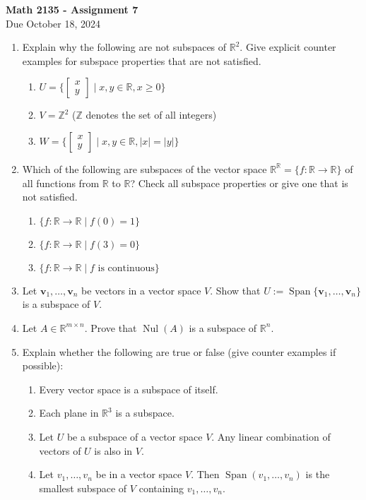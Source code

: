 \documentclass[12pt,oneside]{amsart}
\newcommand{\bv}{\mathbf{v}}
\newcommand{\Z}{\mathbb{Z}}
\newcommand{\R}{\mathbb{R}}
\DeclareMathOperator{\Span}{Span}
\DeclareMathOperator{\Nul}{Nul}
\newcommand{\vt}[2]{\left[\begin{matrix} #1 \\ #2 \end{matrix}\right]}
\begin{document}
\begin{center}
{\Large\textbf{Math 2135 - Assignment 7}}\\
\bigskip
Due October 18, 2024 \\
\end{center}
\bigskip
\thispagestyle{empty}


\begin{enumerate}
 \item
 Explain why the following are not subspaces of $\R^2$.
 Give explicit counter examples for subspace properties that are not satisfied. 
 \begin{enumerate}
 \item $U = \{ \vt{x}{y} \mid x,y\in\R, x\geq 0 \}$
 \item $V = \Z^2$ \quad ($\Z$ denotes the set of all integers)
 \item $W = \{ \vt{x}{y} \mid x,y\in\R, |x|=|y| \}$
 \end{enumerate}
 
\item
 Which of the following are subspaces of the vector space $\R^\R = \{ f \colon \R \to \R \}$ of all functions from
 $\R$ to $\R$? Check all subspace properties or give one that is not satisfied.
\begin{enumerate}
\item $\{ f \colon \R \to \R \mid f(0) = 1 \}$
\item $\{ f \colon \R \to \R \mid f(3) = 0 \}$
\item $\{ f \colon \R \to \R \mid f \text{ is continuous} \}$
\end{enumerate}



\item Let $\bv_1,\ldots,\bv_n$ be vectors in a vector space $V$.
Show that $U := \Span\{\bv_1,\ldots,\bv_n\}$ is a subspace of $V$.


\item
Let $A\in\R^{m \times n}$.
Prove that $\Nul(A)$ is a subspace of $\R^n$.



\item Explain whether the following are true or false (give counter examples if possible):
\begin{enumerate}
\item  
 Every vector space is a subspace of itself.
\item
 Each plane in $\R^3$ is a subspace.
\item
 Let $U$ be a subspace of a vector space $V$. Any linear combination of vectors of $U$ is also in $V$.
\item
 Let $v_1,\dots, v_n$ be in a vector space $V$. Then $\Span(v_1,\dots, v_n)$ is the smallest subspace of $V$
 containing $v_1,\dots, v_n$. 
\end{enumerate}



\end{enumerate}
\end{document}
